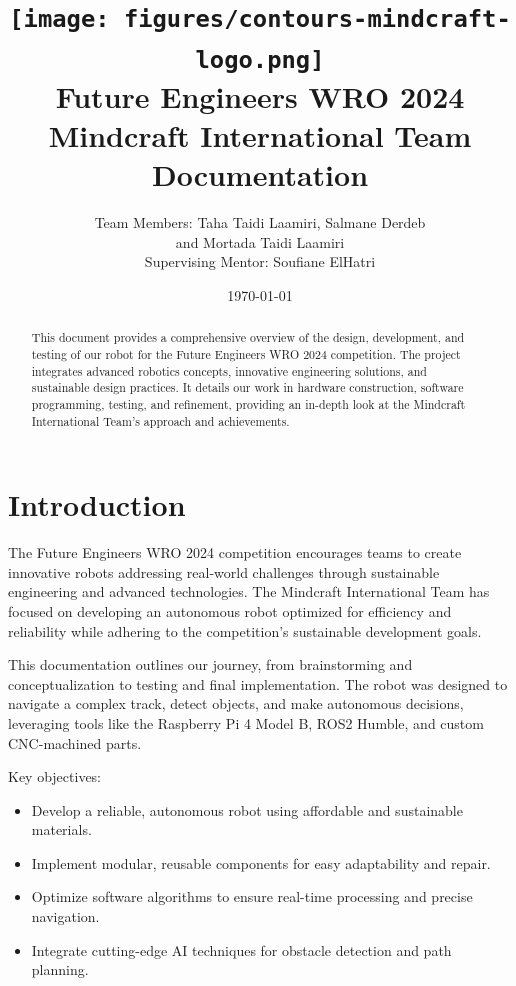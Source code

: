 \documentclass[12pt,a4paper]{article}
\title{\vspace{-2cm} %
    \texttt{[image: figures/contours-mindcraft-logo.png]} \\ %
    \vspace{2cm}
    Future Engineers WRO 2024 \\ \textbf{Mindcraft International Team Documentation}
}
\author{Team Members: Taha Taidi Laamiri, Salmane Derdeb \\ and Mortada Taidi Laamiri \\ Supervising Mentor: Soufiane ElHatri}
\date{\today}
\begin{document}
\maketitle




\begin{abstract}
This document provides a comprehensive overview of the design, development, and testing of our robot for the Future Engineers WRO 2024 competition. The project integrates advanced robotics concepts, innovative engineering solutions, and sustainable design practices. It details our work in hardware construction, software programming, testing, and refinement, providing an in-depth look at the Mindcraft International Team's approach and achievements.
\end{abstract}



\newpage
\tableofcontents

\pagestyle{fancy}
\fancyhf{}
\fancyhead[R]{\thepage}
\newpage

\section{Introduction}
The Future Engineers WRO 2024 competition encourages teams to create innovative robots addressing real-world challenges through sustainable engineering and advanced technologies. The Mindcraft International Team has focused on developing an autonomous robot optimized for efficiency and reliability while adhering to the competition's sustainable development goals.

This documentation outlines our journey, from brainstorming and conceptualization to testing and final implementation. The robot was designed to navigate a complex track, detect objects, and make autonomous decisions, leveraging tools like the Raspberry Pi 4 Model B, ROS2 Humble, and custom CNC-machined parts.

Key objectives:
\begin{itemize}
    \item Develop a reliable, autonomous robot using affordable and sustainable materials.
    \item Implement modular, reusable components for easy adaptability and repair.
    \item Optimize software algorithms to ensure real-time processing and precise navigation.
    \item Integrate cutting-edge AI techniques for obstacle detection and path planning.
\end{itemize}
\end{document}
